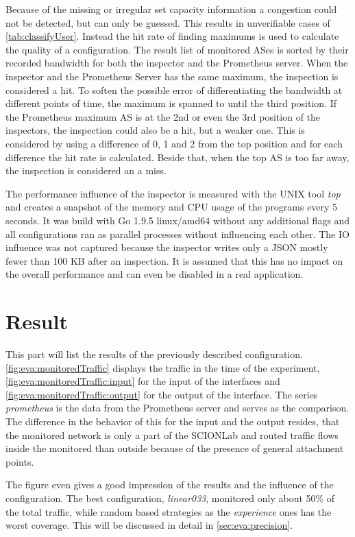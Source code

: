 \documentclass[thesis.tex]{subfiles}
\begin{document}
Because of the missing or irregular set capacity information a congestion could not be detected, but can only be guessed. This results in unverifiable cases of \autoref{tab:classifyUser}. Instead the hit rate of finding maximums is used to calculate the quality of a configuration. The result list of monitored ASes is sorted by their recorded bandwidth for both the inspector and the Prometheus server. When the inspector and the Prometheus Server has the same maximum, the inspection is considered a hit. To soften the possible error of differentiating the bandwidth at different points of time, the maximum is spanned to until the third position. If the Prometheus maximum AS is at the 2nd or even the 3rd position of the inspectors, the inspection could also be a hit, but a weaker one. This is considered by using a difference of 0, 1 and 2 from the top position and for each difference the hit rate is calculated. Beside that, when the top AS is too far away, the inspection is considered an a miss.

The performance influence of the inspector is measured with the UNIX tool \textit{top} and creates a snapshot of the memory and CPU usage of the programs every 5 seconds. It was build with Go 1.9.5 linux/amd64 without any additional flags and all configurations ran as parallel processes without influencing each other. The IO influence was not captured because the inspector writes only a JSON mostly fewer than 100 KB after an inspection. It is assumed that this has no impact on the overall performance and can even be disabled in a real application.

\section{Result}
This part will list the results of the previously described configuration. \autoref{fig:eva:monitoredTraffic} displays the traffic in the time of the experiment, \autoref{fig:eva:monitoredTraffic:input} for the input of the interfaces and \autoref{fig:eva:monitoredTraffic:output} for the output of the interface. The series \textit{prometheus} is the data from the Prometheus server and serves as the comparison. The difference in the behavior of this for the input and the output resides, that the monitored network is only a part of the SCIONLab and routed traffic flows inside the monitored than outside because of the presence of general attachment points. 

The figure even gives a good impression of the results and the influence of the configuration. The best configuration, \textit{linear033}, monitored only about 50\% of the total traffic, while random based strategies as the \textit{experience} ones has the worst coverage. This will be discussed in detail in \autoref{sec:eva:precision}.
\end{document}
